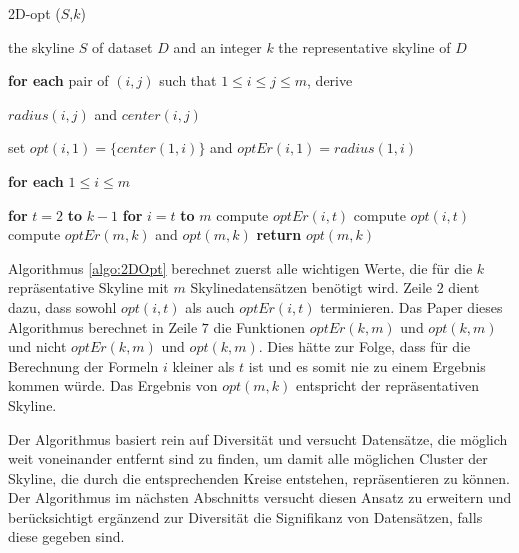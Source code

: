 \begin{algorithm}[H]
\caption{2D-opt ($S$,$k$)}\label{algo:2DOpt}
\begin{algorithmic}[1]
\INPUTBF the skyline $S$ of dataset $D$ and an integer $k$
\OUTPUTBF the representative skyline of $D$
\State \parbox[t]{\dimexpr\linewidth-\algorithmicindent}{\textbf{for each} pair of $(i,j)$ such that $1 \leq i \leq j \leq m$, derive\par 
$radius(i,j)$ and $center(i,j)$\strut}
\State \parbox[t]{\dimexpr\linewidth-\algorithmicindent}{set $opt(i,1) = \{center(1,i)\}$ and $optEr(i,1)=radius(1,i)$\par
\textbf{for each} $1 \leq i \leq m$\strut}
\State \textbf{for} $t=2$ \textbf{to} $k-1$
\State \hspace{\algorithmicindent} \textbf{for} $i=t$ \textbf{to} $m$
\State \hspace{\algorithmicindent}\hspace{\algorithmicindent} compute $optEr(i,t)$
\State \hspace{\algorithmicindent}\hspace{\algorithmicindent} compute $opt(i,t)$
\State compute $optEr(m,k)$ and $opt(m,k)$
\State \textbf{return} $opt(m,k)$
\end{algorithmic}
\end{algorithm}

Algorithmus \ref{algo:2DOpt} berechnet zuerst alle wichtigen Werte, die für die $k$ repräsentative Skyline mit $m$ Skylinedatensätzen benötigt wird. Zeile $2$ dient dazu, dass sowohl $opt(i,t)$ als auch $optEr(i,t)$ terminieren. Das Paper \cite{Tao:2009:DRS:1546683.1547325} dieses Algorithmus berechnet in Zeile $7$ die Funktionen $optEr(k,m)$ und $opt(k,m)$ und nicht $optEr(k,m)$ und $opt(k,m)$. Dies hätte zur Folge, dass für die Berechnung der Formeln $i$ kleiner als $t$ ist und es somit nie zu einem Ergebnis kommen würde.
Das Ergebnis von $opt(m,k)$ entspricht der repräsentativen Skyline.

Der Algorithmus basiert rein auf Diversität und versucht Datensätze, die möglich weit voneinander entfernt sind zu finden, um damit alle möglichen Cluster der Skyline, die durch die entsprechenden Kreise entstehen, repräsentieren zu können. Der Algorithmus im nächsten Abschnitts versucht diesen Ansatz zu erweitern und berücksichtigt ergänzend zur Diversität die Signifikanz von Datensätzen, falls diese gegeben sind.  
